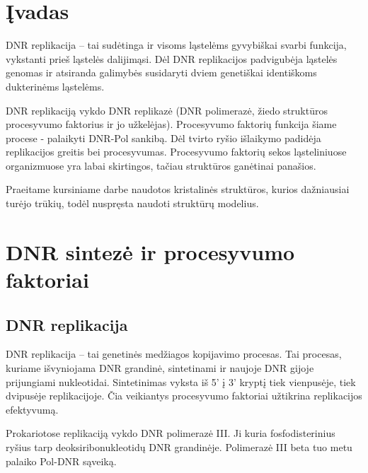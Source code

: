 \documentclass[a4paper,12pt]{article}
\begin{document}
\tableofcontents

\clearpage
\normalsize





\section*{Įvadas}
	


	DNR replikacija – tai sudėtinga ir visoms ląstelėms gyvybiškai svarbi funkcija, vykstanti prieš ląstelės dalijimąsi. Dėl DNR replikacijos padvigubėja ląstelės genomas ir atsiranda galimybės susidaryti dviem genetiškai identiškoms dukterinėms ląstelėms. 
	
DNR replikaciją vykdo DNR replikazė (DNR polimerazė, žiedo struktūros procesyvumo faktorius ir jo užkelėjas). Procesyvumo faktorių funkcija šiame procese - palaikyti  DNR-Pol sankibą. Dėl tvirto ryšio išlaikymo padidėja replikacijos greitis bei procesyvumas. Procesyvumo faktorių sekos ląsteliniuose organizmuose yra labai skirtingos, tačiau struktūros ganėtinai panašios. 
	
Praeitame kursiniame darbe naudotos kristalinės struktūros, kurios dažniausiai turėjo trūkių, todėl nuspręsta naudoti struktūrų modelius.

\label{sec:intro}

\clearpage

\section{DNR sintezė ir procesyvumo faktoriai}

\subsection{DNR replikacija}
\qquad DNR replikacija – tai genetinės medžiagos kopijavimo procesas. Tai procesas, kuriame išvyniojama DNR grandinė, sintetinami ir naujoje DNR gijoje prijungiami nukleotidai. Sintetinimas vyksta iš 5' į 3' kryptį tiek vienpusėje, tiek dvipusėje replikacijoje. Čia veikiantys procesyvumo faktoriai užtikrina replikacijos efektyvumą.
\smallskip

\qquad Prokariotose replikaciją vykdo DNR polimerazė III. Ji kuria fosfodisterinius ryšius tarp deoksiribonukleotidų DNR grandinėje. Polimerazė III beta tuo metu palaiko Pol-DNR sąveiką.

 
\end{document}
